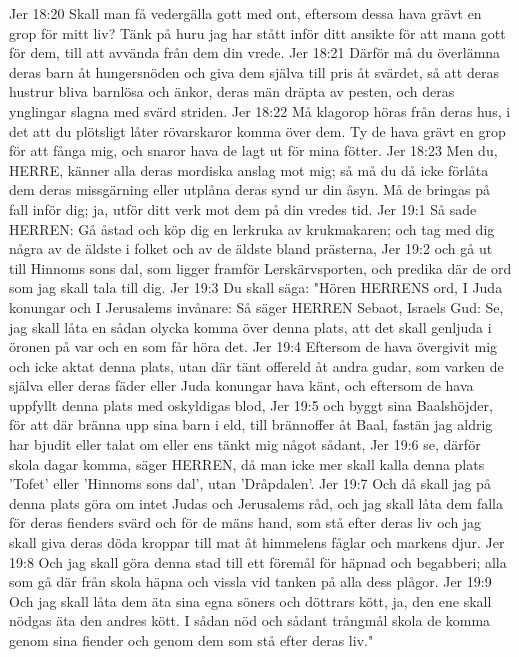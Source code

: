 Jer 18:20  Skall man få vedergälla gott med ont, eftersom dessa hava grävt en grop för mitt liv? Tänk på huru jag har stått inför ditt ansikte för att mana gott för dem, till att avvända från dem din vrede.
Jer 18:21  Därför må du överlämna deras barn åt hungersnöden och giva dem själva till pris åt svärdet, så att deras hustrur bliva barnlösa och änkor, deras män dräpta av pesten, och deras ynglingar slagna med svärd striden.
Jer 18:22  Må klagorop höras från deras hus, i det att du plötsligt låter rövarskaror komma över dem. Ty de hava grävt en grop för att fånga mig, och snaror hava de lagt ut för mina fötter.
Jer 18:23  Men du, HERRE, känner alla deras mordiska anslag mot mig; så må du då icke förlåta dem deras missgärning eller utplåna deras synd ur din åsyn. Må de bringas på fall inför dig; ja, utför ditt verk mot dem på din vredes tid.
Jer 19:1  Så sade HERREN: Gå åstad och köp dig en lerkruka av krukmakaren; och tag med dig några av de äldste i folket och av de äldste bland prästerna,
Jer 19:2  och gå ut till Hinnoms sons dal, som ligger framför Lerskärvsporten, och predika där de ord som jag skall tala till dig.
Jer 19:3  Du skall säga: "Hören HERRENS ord, I Juda konungar och I Jerusalems invånare: Så säger HERREN Sebaot, Israels Gud: Se, jag skall låta en sådan olycka komma över denna plats, att det skall genljuda i öronen på var och en som får höra det.
Jer 19:4  Eftersom de hava övergivit mig och icke aktat denna plats, utan där tänt offereld åt andra gudar, som varken de själva eller deras fäder eller Juda konungar hava känt, och eftersom de hava uppfyllt denna plats med oskyldigas blod,
Jer 19:5  och byggt sina Baalshöjder, för att där bränna upp sina barn i eld, till brännoffer åt Baal, fastän jag aldrig har bjudit eller talat om eller ens tänkt mig något sådant,
Jer 19:6  se, därför skola dagar komma, säger HERREN, då man icke mer skall kalla denna plats 'Tofet' eller 'Hinnoms sons dal', utan 'Dråpdalen'.
Jer 19:7  Och då skall jag på denna plats göra om intet Judas och Jerusalems råd, och jag skall låta dem falla för deras fienders svärd och för de mäns hand, som stå efter deras liv och jag skall giva deras döda kroppar till mat åt himmelens fåglar och markens djur.
Jer 19:8  Och jag skall göra denna stad till ett föremål för häpnad och begabberi; alla som gå där från skola häpna och vissla vid tanken på alla dess plågor.
Jer 19:9  Och jag skall låta dem äta sina egna söners och döttrars kött, ja, den ene skall nödgas äta den andres kött. I sådan nöd och sådant trångmål skola de komma genom sina fiender och genom dem som stå efter deras liv."
